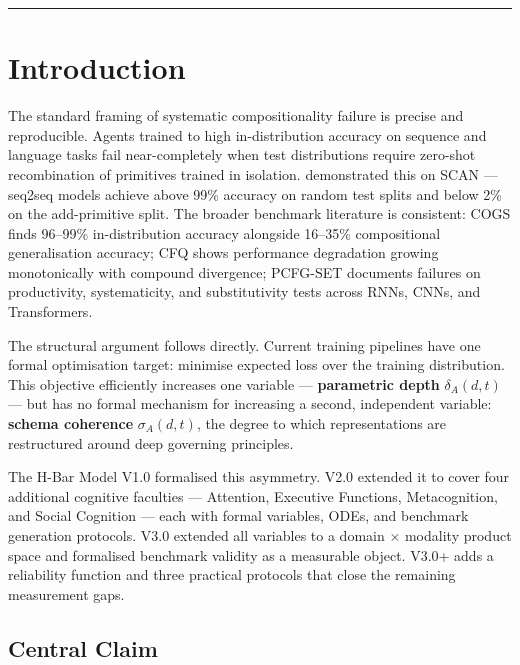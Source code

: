 \documentclass[11pt,a4paper]{article}
\begin{document}
\bigskip
\noindent\rule{\linewidth}{0.4pt}

\section{Introduction}\label{sec:introduction}

The standard framing of systematic compositionality failure is precise
and reproducible. Agents trained to high in-distribution accuracy on
sequence and language tasks fail near-completely when test distributions
require zero-shot recombination of primitives trained in isolation.
\cite{lake2018generalizationwithoutsystematicity} demonstrated this on
SCAN --- seq2seq models achieve above 99\% accuracy on random test splits
and below 2\% on the add-primitive split. The broader benchmark
literature is consistent: COGS \citep{kim2020cogscompositionalgeneralizationchallenge}
finds 96--99\% in-distribution accuracy alongside 16--35\% compositional
generalisation accuracy; CFQ \citep{keysers2020measuringcompositionalgeneralizationcomprehensive}
shows performance degradation growing monotonically with compound
divergence; PCFG-SET \citep{hupkes2020compositionalitydecomposed} documents
failures on productivity, systematicity, and substitutivity tests across
RNNs, CNNs, and Transformers.

The structural argument follows directly. Current training pipelines have
one formal optimisation target: minimise expected loss over the training
distribution. This objective efficiently increases one variable ---
\textbf{parametric depth} $\delta_A(d,t)$ --- but has no formal
mechanism for increasing a second, independent variable: \textbf{schema
coherence} $\sigma_A(d,t)$, the degree to which representations are
restructured around deep governing principles.

The H-Bar Model V1.0 formalised this asymmetry. V2.0 extended it to
cover four additional cognitive faculties --- Attention, Executive
Functions, Metacognition, and Social Cognition --- each with formal
variables, ODEs, and benchmark generation protocols. V3.0 extended all
variables to a domain $\times$ modality product space and formalised
benchmark validity as a measurable object. V3.0+ adds a reliability
function and three practical protocols that close the remaining
measurement gaps.

\subsection{Central Claim}\label{sec:central-claim}
\end{document}

